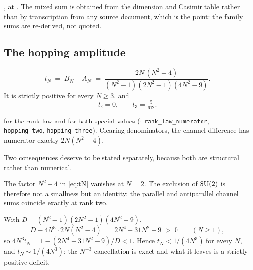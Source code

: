 \noindent\Tzero{}, at . The
mixed sum is obtained from the dimension and Casimir table rather than
by transcription from any source document, which is the point: the
family sums are re-derived, not quoted.

\subsection{The hopping amplitude}

\begin{theorem}
\label{thm:tN}
\begin{equation}
  t_N \;=\; B_N - A_N
  \;=\; \frac{2N\,(N^2-4)}{(N^2-1)(2N^2-1)(4N^2-9)} .
  \label{eq:tN}
\end{equation}
It is strictly positive for every $N \ge 3$, and
\begin{equation}
  t_2 = 0, \qquad t_3 = \tfrac{5}{612}.
\end{equation}
\end{theorem}

\noindent\Tzero{} for the rank law and for both special values
(: \texttt{rank\_law\_numerator},
\texttt{hopping\_two}, \texttt{hopping\_three}). Clearing denominators,
the channel difference has numerator exactly $2N(N^2-4)$.

Two consequences deserve to be stated separately, because both are
structural rather than numerical.

\begin{corollary}
\label{cor:su2}
The factor $N^2 - 4$ in \eqref{eq:tN} vanishes at $N = 2$. The exclusion
of $\mathrm{SU}(2)$ is therefore not a smallness but an identity: the parallel
and antiparallel channel sums coincide exactly at rank two.
\end{corollary}

\begin{corollary}
\label{cor:deficit}
With $D = (N^2-1)(2N^2-1)(4N^2-9)$,
\begin{equation}
  D - 4N^3 \cdot 2N(N^2-4) \;=\; 2N^4 + 31N^2 - 9 \;>\; 0
  \qquad (N \ge 1),
\end{equation}
so $4N^3 t_N = 1 - (2N^4+31N^2-9)/D < 1$. Hence
$t_N < 1/(4N^3)$ for every $N$, and $t_N \sim 1/(4N^3)$: the
$N^{-3}$ cancellation is exact and what it leaves is a strictly positive
deficit.
\end{corollary}

